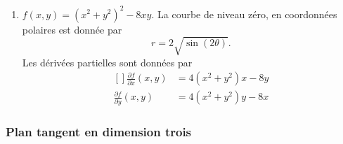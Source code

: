 \begin{example}
\begin{enumerate}
		      Le plan tangent à la coupole de sphère en $(0,0,1)$ est évidemment horizontal. Nous nous attendons donc à trouver que la différentielle de $f$ en $(0,0)$ est nulle. Simple calcul :
		      \begin{equation}
			      \frac{ \partial f }{ \partial x }(x,y)=\frac{ 1 }{2}\frac{ -2x }{ \sqrt{1-x^2-y^2} },
		      \end{equation}
		      et
		      \begin{equation}
			      \frac{ \partial f }{ \partial y }(x,y)=\frac{ 1 }{2}\frac{ -2y }{ \sqrt{1-x^2-y^2} }.
		      \end{equation}
		      Évaluées en $(0,0)$, ce deux dérivées partielles sont nulles. Donc \emph{si la différentielle existe} en $(0,0)$, elle sera nulle (voir l'expression \eqref{EqDiffPartRap}). Afin de voir qu'elle existe, il faut juste montrer que $df_{(0,0)}(x,y)=0$ fonctionne dans la définition \ref{DefDifferentiellePta}.

		\item
		      $f(x,y)=(x^2+y^2)^2-8xy$. La courbe de niveau zéro, en coordonnées polaires est donnée par
		      \begin{equation}
			      r=2\sqrt{\sin(2\theta)}.
		      \end{equation}
		      Les dérivées partielles sont données par
		      \begin{equation}
			      \begin{aligned}[]
				      \frac{ \partial f }{ \partial x }(x,y) & =4(x^2+y^2)x-8y \\
				      \frac{ \partial f }{ \partial y }(x,y) & =4(x^2+y^2)y-8x
			      \end{aligned}
		      \end{equation}

	\end{enumerate}
\end{example}

\subsubsection{Plan tangent en dimension trois}

